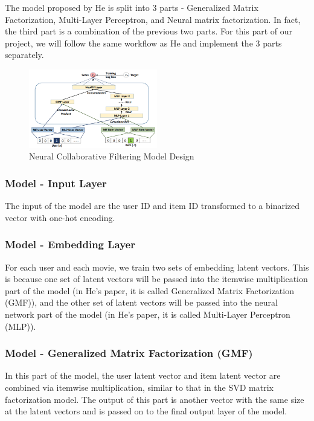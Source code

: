 \documentclass[final]{cvpr}
\begin{document}
The model proposed by He is split into 3 parts - Generalized Matrix Factorization, Multi-Layer Perceptron, and Neural matrix factorization. In fact, the third part is a combination of the previous two parts. For this part of our project, we will follow the same workflow as He and implement the 3 parts separately. 

\begin{figure}[h]
	\includegraphics[width=0.5\textwidth]{./NeuCF.PNG}
	\caption{Neural Collaborative Filtering Model Design \cite{he2017neural}}
\end{figure}

\subsubsection{Model - Input Layer}

The input of the model are the user ID and item ID transformed to a binarized vector with one-hot encoding.

\subsubsection{Model - Embedding Layer}

For each user and each movie, we train two sets of embedding latent vectors. This is because one set of latent
vectors will be passed into the itemwise multiplication part
of the model (in He’s paper, it is called Generalized Matrix
Factorization (GMF)), and the other set of latent vectors will
be passed into the neural network part of the model (in He’s
paper, it is called Multi-Layer Perceptron (MLP)).

\subsubsection{Model - Generalized Matrix Factorization (GMF)}

In this part of the model, the user latent vector and item latent vector are combined via itemwise multiplication, similar to that in the SVD matrix factorization model. The output of this part is another vector with the same size at the latent vectors and is passed on to the final output layer of the model.
\end{document}
